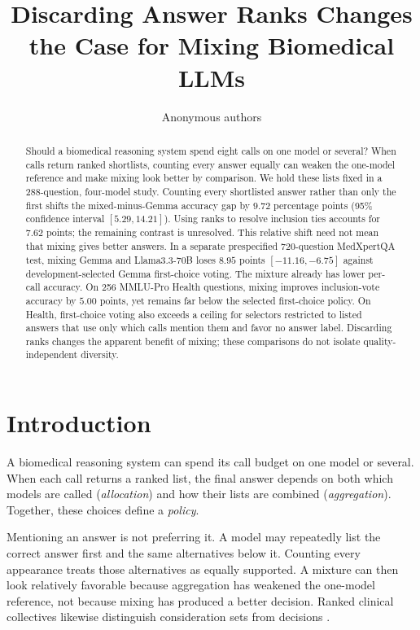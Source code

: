 \documentclass{article}
\title{Discarding Answer Ranks Changes the Case for Mixing Biomedical LLMs}
\author{Anonymous authors}
\begin{document}
\maketitle

\begin{abstract}
Should a biomedical reasoning system spend eight calls on one model or several? When calls return ranked shortlists, counting every answer equally can weaken the one-model reference and make mixing look better by comparison. We hold these lists fixed in a 288-question, four-model study. Counting every shortlisted answer rather than only the first shifts the mixed-minus-Gemma accuracy gap by $9.72$ percentage points (95\% confidence interval $[5.29,14.21]$). Using ranks to resolve inclusion ties accounts for $7.62$ points; the remaining contrast is unresolved. This relative shift need not mean that mixing gives better answers. In a separate prespecified 720-question MedXpertQA test, mixing Gemma and Llama3.3-70B loses $8.95$ points $[-11.16,-6.75]$ against development-selected Gemma first-choice voting. The mixture already has lower per-call accuracy. On 256 MMLU-Pro Health questions, mixing improves inclusion-vote accuracy by $5.00$ points, yet remains far below the selected first-choice policy. On Health, first-choice voting also exceeds a ceiling for selectors restricted to listed answers that use only which calls mention them and favor no answer label. Discarding ranks changes the apparent benefit of mixing; these comparisons do not isolate quality-independent diversity.
\end{abstract}

\section{Introduction}

A biomedical reasoning system can spend its call budget on one model or several. When each call returns a ranked list, the final answer depends on both which models are called (\emph{allocation}) and how their lists are combined (\emph{aggregation}). Together, these choices define a \emph{policy}.

Mentioning an answer is not preferring it. A model may repeatedly list the correct answer first and the same alternatives below it. Counting every appearance treats those alternatives as equally supported. A mixture can then look relatively favorable because aggregation has weakened the one-model reference, not because mixing has produced a better decision. Ranked clinical collectives likewise distinguish consideration sets from decisions \citep{zoller2025collectives}.
\end{document}
